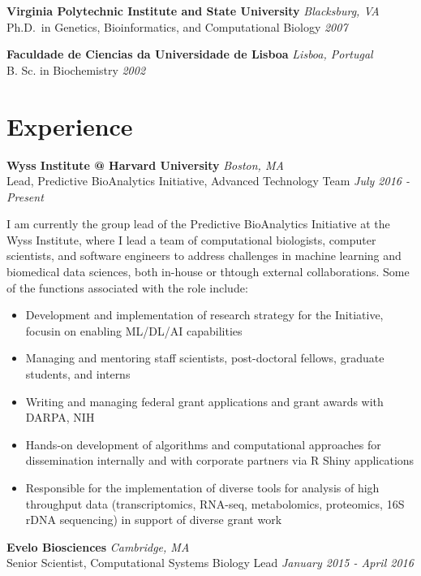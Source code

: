 \documentclass[11pt, a4paper]{awesome-cv}
\providecommand{\tightlist}{%
	\setlength{\itemsep}{0pt}\setlength{\parskip}{0pt}}
\begin{document}
\textbf{{Virginia Polytechnic Institute and State University}}
\hfill \emph{Blacksburg, VA}\\
Ph.D.~in Genetics, Bioinformatics, and Computational Biology
\hfill \emph{2007}

\textbf{{Faculdade de Ciencias da Universidade de Lisboa}}
\hfill \emph{Lisboa, Portugal}\\
B. Sc. in Biochemistry \hfill \emph{2002}

\section{Experience}\label{experience}

\textbf{{Wyss Institute @ Harvard University}} \hfill \emph{Boston,
MA}\\
Lead, Predictive BioAnalytics Initiative, Advanced Technology Team
\hfill \emph{July 2016 - Present}

I am currently the group lead of the Predictive BioAnalytics Initiative
at the Wyss Institute, where I lead a team of computational biologists,
computer scientists, and software engineers to address challenges in
machine learning and biomedical data sciences, both in-house or thtough
external collaborations. Some of the functions associated with the role
include:

\begin{itemize}
\tightlist
\item
  Development and implementation of research strategy for the
  Initiative, focusin on enabling ML/DL/AI capabilities
\item
  Managing and mentoring staff scientists, post-doctoral fellows,
  graduate students, and interns
\item
  Writing and managing federal grant applications and grant awards with
  DARPA, NIH
\item
  Hands-on development of algorithms and computational approaches for
  dissemination internally and with corporate partners via R Shiny
  applications
\item
  Responsible for the implementation of diverse tools for analysis of
  high throughput data (transcriptomics, RNA-seq, metabolomics,
  proteomics, 16S rDNA sequencing) in support of diverse grant work
\end{itemize}

\textbf{{Evelo Biosciences}} \hfill \emph{Cambridge, MA}\\
Senior Scientist, Computational Systems Biology Lead
\hfill \emph{January 2015 - April 2016}
\end{document}
